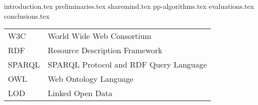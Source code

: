 \documentclass[inscr,ack]{dithesis}
\begin{document}
\frontmatter

\mainmatter


{introduction.tex}
{preliminaries.tex}
{sharemind.tex}
{pp-algorithms.tex}
{evaluations.tex}
{conclusions.tex}


\backmatter

\abbreviations
\begin{center}
	\renewcommand{\arraystretch}{1.5}
	\begin{longtable}{ l @{\qquad} l }
	\toprule
  W3C    & World Wide Web Consortium \\
	RDF    & Resource Description Framework \\
	SPARQL & SPARQL Protocol and RDF Query Language \\
	OWL    & Web Ontology Language \\
  LOD    & Linked Open Data \\
	\bottomrule
	\end{longtable}
\end{center}



\end{document}
